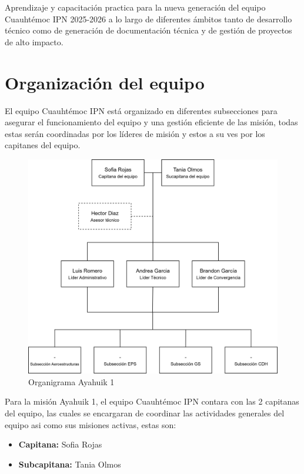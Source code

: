 \documentclass[letterpaper,12pt]{article} %
\begin{document}
    Aprendizaje y capacitación practica para la nueva generación del equipo Cuauhtémoc IPN 2025-2026 a lo largo de diferentes
    ámbitos tanto de desarrollo técnico como de generación de documentación técnica y de gestión de proyectos de alto impacto. 



\newpage

\section{Organización del equipo}

    El equipo Cuauhtémoc IPN está organizado en diferentes subsecciones para asegurar el funcionamiento del equipo y una gestión 
    eficiente de las misión, todas estas serán coordinadas por los líderes de misión 
    y estos a su ves por los capitanes del equipo. 
    \begin{figure}[!h]
      \centerline{\includegraphics[width=.8\textwidth]{ORG-AYA1-GM-V3.png}}
      \caption{Organigrama Ayahuik 1}
      \label{1}
    \end{figure}
    
    Para la misión Ayahuik 1, el equipo Cuauhtémoc IPN contara con las 2 capitanas del equipo, 
    las cuales se encargaran de coordinar las actividades generales del equipo asi como sus misiones activas, 
    estas son:

    \begin{itemize}
        \item \textbf{Capitana:} Sofia Rojas
        \item \textbf{Subcapitana:} Tania Olmos
    
    \end{itemize}
\end{document}
